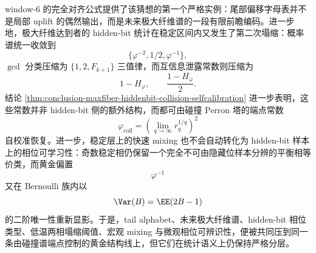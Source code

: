 \noindent
window-\(6\) 的完全对齐公式提供了该猜想的第一个严格实例：尾部偏移字母表并不是局部 uplift 的偶然输出，而是未来极大纤维谱的一段有限前瞻编码。进一步地，极大纤维达到者的 hidden-bit 统计在稳定区间内又发生了第二次塌缩：概率谱统一收敛到
\[
\{\varphi^{-2},1/2,\varphi^{-1}\},
\]
\(\gcd\) 分类压缩为 \(\{1,2,F_{k+1}\}\) 三值律，而互信息泄露常数则压缩为
\[
1-H_\varphi,\qquad \frac{1-H_\varphi}{2}.
\]
结论 \ref{thm:conclusion-maxfiber-hiddenbit-collision-selfcalibration} 进一步表明，这些常数并非 hidden-bit 侧的额外结构，而都可由碰撞 Perron 塔的端点常数
\[
\varphi_{\mathrm{coll}}=\left(\lim_{q\to\infty}r_q^{1/q}\right)^2
\]
自校准恢复。进一步，稳定层上的快速 mixing 也不会自动转化为 hidden-bit 样本上的相位可学习性：奇数稳定相仍保留一个完全不可由隐藏位样本分辨的平衡相等价类，而黄金偏置
\[
\varphi^{-1}
\]
又在 Bernoulli 族内以
\[
\Var(B)=\EE(2B-1)
\]
的二阶唯一性重新显影。于是，tail alphabet、未来极大纤维谱、hidden-bit 相位类型、低温两相塌缩阈值、宏观 mixing 与微观相位可辨识性，便被共同压到同一条由碰撞谱端点控制的黄金结构线上，但它们在统计语义上仍保持严格分层。
